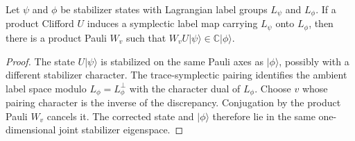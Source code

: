 \begin{lemma}\label{lem:pauli-phase-correction}
Let \(\psi\) and \(\phi\) be stabilizer states with Lagrangian label groups
\(L_\psi\) and \(L_\phi\).  If a product Clifford \(U\) induces a
symplectic label map carrying \(L_\psi\) onto \(L_\phi\), then there is a
product Pauli \(W_v\) such that
\(W_vU\lvert\psi\rangle\in\mathbb C\lvert\phi\rangle\).
\end{lemma}

\begin{proof}
The state \(U\lvert\psi\rangle\) is stabilized on the same Pauli axes as
\(\lvert\phi\rangle\), possibly with a different stabilizer character.
The trace-symplectic pairing identifies the ambient label space modulo
\(L_\phi=L_\phi^\perp\) with the character dual of \(L_\phi\).  Choose
\(v\) whose pairing character is the inverse of the discrepancy.
Conjugation by the product Pauli \(W_v\) cancels it.  The corrected state
and \(\lvert\phi\rangle\) therefore lie in the same one-dimensional joint
stabilizer eigenspace.
\end{proof}

